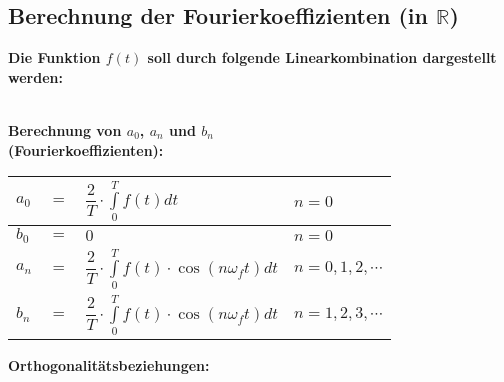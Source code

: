 	\subsection{Berechnung der Fourierkoeffizienten (in $\mathbb{R}$)}
		\textbf{Die Funktion $f(t)$ soll durch folgende Linearkombination dargestellt werden:}\\[3pt]
		\\[3pt]
		\begin{minipage}[t]{0.5\textwidth}
			\textbf{Berechnung von $a_0$, $a_n$ und $b_n$\\[1pt] (Fourierkoeffizienten):}\\[3pt]
			\begin{tabular}{|lll|l|}
				\hline
				$\displaystyle a_0$ & $=$ & $\displaystyle \dfrac{2}{T} \cdot \int\limits_{0}^{T} f(t) dt$ & $\displaystyle n = 0$\\[0.2pt]
				\hline
				$\displaystyle b_0$ & $\displaystyle =$ & $\displaystyle 0$ & $\displaystyle n = 0$\\
				\hline
				$\displaystyle a_n$ & $\displaystyle =$ & $\displaystyle \dfrac{2}{T} \cdot \int\limits_{0}^{T} f(t) \cdot \cos(n \omega_f t) dt$ & $\displaystyle n = 0, 1, 2, \cdots$\\
				\hline
				$\displaystyle b_n$ & $\displaystyle =$ & $\displaystyle \dfrac{2}{T} \cdot \int\limits_{0}^{T} f(t) \cdot \cos(n \omega_f t) dt$ & $\displaystyle n = 1, 2, 3, \cdots$\\
				\hline
			\end{tabular}
		\end{minipage}
		\begin{minipage}[t]{0.5\textwidth}
			\textbf{Orthogonalitätsbeziehungen:}\\[6pt]
			
		\end{minipage}